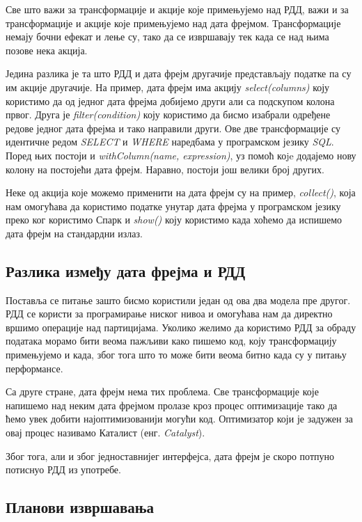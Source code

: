 \documentclass[12pt,oneside]{memoir}
\begin{document}
Све што важи за трансформације и акције које примењујемо над РДД, важи и за трансформације и акције које примењујемо над дата фрејмом. Трансформације немају бочни ефекат и лење су, тако да се извршавају тек када се над њима позове нека акција.

Једина разлика је та што РДД и дата фрејм другачије представљају податке па су им акције другачије. На пример, дата фрејм има акцију \textit{select(columns)} коју користимо да од једног дата фрејма добијемо други али са подскупом колона првог. Друга је \textit{filter(condition)} коју користимо да бисмо изабрали одређене редове једног дата фрејма и тако направили други. Ове две трансформације су идентичне редом \textit{SELECT} и \textit{WHERE} наредбама у програмском језику \textit{SQL}. Поред њих постоји и \textit{withColumn(name, expression)}, уз помоћ коje додајемо нову колону на постојећи дата фрејм. Наравно, постоји још велики број других. \cite{spark_guide}

Неке од акција које можемо применити на дата фрејм су на пример, \textit{collect()}, која нам омогућава да користимо податке унутар дата фрејма у програмском језику преко ког користимо Спарк и \textit{show()} коју користимо када хоћемо да испишемо дата фрејм на стандардни излаз. \cite{spark_guide}

\subsection{Разлика између дата фрејма и РДД}
\label{subsec:spark_df_vs_rdd}

Поставља се питање зашто бисмо користили један од ова два модела пре другог. РДД се користи за програмирање ниског нивоа и омогућава нам да директно вршимо операције над партицијама. Уколико желимо да користимо РДД за обраду података морамо бити веома пажљиви како пишемо код, коју трансформацију примењујемо и када, због тога што то може бити веома битно када су у питању перформансе. \cite{spark_guide}

Са друге стране, дата фрејм нема тих проблема. Све трансформације које напишемо над неким дата фрејмом пролазе кроз процес оптимизације тако да ћемо увек добити најоптимизованији могући код. Оптимизатор који је задужен за овај процес називамо Каталист (енг. \textit{Catalyst}). \cite{spark_guide}

Због тога, али и због једноставнијег интерфејса, дата фрејм је скоро потпуно потиснуо РДД из употребе.

\subsection{Планови извршавања}
\label{subsec:spark_exec_plans}
\end{document}
